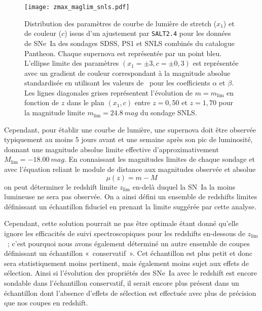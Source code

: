 \documentclass[../main/main.tex]{subfiles}
\begin{document}
\begin{figure}
    \centering
    \texttt{[image: zmax\_maglim\_snls.pdf]}
    \caption[Distribution et limite des paramètres de courbe de lumière de
    stretch ($x_1$) et de couleur ($c$) des sondages SDSS, PS1 et SNLS combinés
    du catalogue Pantheon.]{Distribution des paramètres de courbe de lumière de
        stretch ($x_1$) et de couleur ($c$) issus d'un ajustement par
        \texttt{SALT2.4} pour les données de SNe~Ia des sondages SDSS, PS1 et
        SNLS combinés du catalogue Pantheon. Chaque supernova est représentée
        par un point bleu. L'ellipse limite des paramètres $(x_1=\pm3,
        c=\pm0,3)$ est représentée avec un gradient de couleur correspondant à
        la magnitude absolue standardisée en utilisant les valeurs
        de~\cite{scolnic2018} pour les coefficients $\alpha$ et $\beta$. Les
        lignes diagonales grises représentent l'évolution de $m = m_{\lim}$ en
        fonction de $z$ dans le plan $(x_1,c)$ entre $z=0,50$ et $z=1,70$ pour
    la magnitude limite $m_{\lim}=\SI{24,8}{mag}$ du sondage SNLS.}
    \label{fig:maglim}
\end{figure}

Cependant, pour établir une courbe de lumière, une supernova doit être observée
typiquement au moins 5 jours avant et une semaine après son pic de luminosité,
donnant une magnitude absolue limite effective d'approximativement $M_{\lim}
= \SI{-18,00}{mag}$. En connaissant les magnitudes limites de chaque sondage et
avec l'équation reliant le module de distance aux magnitudes observée et
absolue
\begin{equation}\label{eq:distmod}
    \mu(z) = m - M
\end{equation}
on peut déterminer le redshift limite $z_{\lim}$ en-delà duquel la SN~Ia la
moins lumineuse ne sera pas observée. On a ainsi défini un ensemble de redshifts
limites définissant un échantillon fiduciel en prenant la limite suggérée par
cette analyse.

Cependant, cette solution pourrait ne pas être optimale étant donné qu'elle
ignore les efficacités de suivi spectroscopiques pour les redshifts en-dessous
de $z_{\lim}$~; c'est pourquoi nous avons également déterminé un autre ensemble
de coupes définissant un échantillon «~conservatif~». Cet échantillon est plus
petit et donc sera statistiquement moins pertinent, mais également moins sujet
aux effets de sélection. Ainsi si l'évolution des propriétés des SNe~Ia avec le
redshift est encore sondable dans l'échantillon conservatif, il serait encore
plus présent dans un échantillon dont l'absence d'effets de sélection est
effectuée avec plus de précision que nos coupes en redshift.
\end{document}
